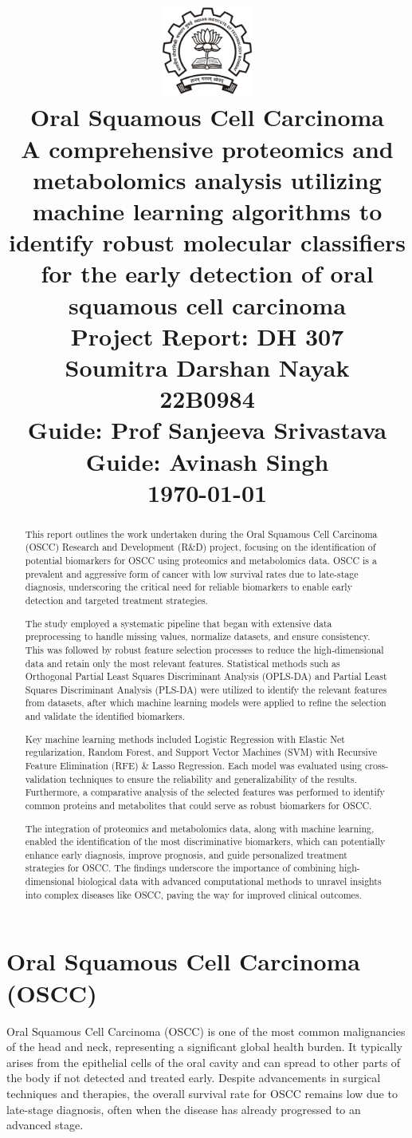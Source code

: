 \documentclass[a4paper,12pt]{article}
\title{
    \includegraphics[width=3cm]{images/iitblogo.png} \\ %
    \vspace{1cm}
    \LARGE \textbf{Oral Squamous Cell Carcinoma}\\
    \vspace{0.2cm}
    \Large A comprehensive proteomics and metabolomics analysis utilizing machine learning algorithms to identify robust molecular classifiers for the early detection of oral squamous cell carcinoma\\
    \vspace{0.5cm}
    \Large \textbf{Project Report: DH 307}\\
    \vspace{0.5cm}
    \Large Soumitra Darshan Nayak \\ 22B0984 \\
    \Large Guide: Prof Sanjeeva Srivastava\\
    \Large Guide: Avinash Singh\\
    \vspace{0.5cm}
    \normalsize \today
}
\date{} %
\begin{document}
\maketitle
\newpage
\begin{abstract}
	This report outlines the work undertaken during the Oral Squamous Cell Carcinoma (OSCC) Research and Development (R\&D) project, focusing on the identification of potential biomarkers for OSCC using proteomics and metabolomics data. OSCC is a prevalent and aggressive form of cancer with low survival rates due to late-stage diagnosis, underscoring the critical need for reliable biomarkers to enable early detection and targeted treatment strategies.

	The study employed a systematic pipeline that began with extensive data preprocessing to handle missing values, normalize datasets, and ensure consistency. This was followed by robust feature selection processes to reduce the high-dimensional data and retain only the most relevant features. Statistical methods such as Orthogonal Partial Least Squares Discriminant Analysis (OPLS-DA) and Partial Least Squares Discriminant Analysis (PLS-DA) were utilized to identify the relevant features from datasets, after which machine learning models were applied to refine the selection and validate the identified biomarkers.

	Key machine learning methods included Logistic Regression with Elastic Net regularization, Random Forest, and Support Vector Machines (SVM) with Recursive Feature Elimination (RFE) \& Lasso Regression. Each model was evaluated using cross-validation techniques to ensure the reliability and generalizability of the results. Furthermore, a comparative analysis of the selected features was performed to identify common proteins and metabolites that could serve as robust biomarkers for OSCC.

	The integration of proteomics and metabolomics data, along with machine learning, enabled the identification of the most discriminative biomarkers, which can potentially enhance early diagnosis, improve prognosis, and guide personalized treatment strategies for OSCC. The findings underscore the importance of combining high-dimensional biological data with advanced computational methods to unravel insights into complex diseases like OSCC, paving the way for improved clinical outcomes.
\end{abstract}

\newpage
\tableofcontents
\newpage
\section{Oral Squamous Cell Carcinoma (OSCC)}
Oral Squamous Cell Carcinoma (OSCC) is one of the most common malignancies of the head and neck, representing a significant global health burden. It typically arises from the epithelial cells of the oral cavity and can spread to other parts of the body if not detected and treated early. Despite advancements in surgical techniques and therapies, the overall survival rate for OSCC remains low due to late-stage diagnosis, often when the disease has already progressed to an advanced stage.
\end{document}
